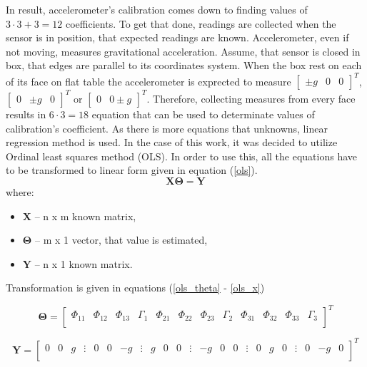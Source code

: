 In result, accelerometer's calibration comes down to finding values of $3 \cdot 3 + 3 = 12$ coefficients. To get that done, readings are collected when the sensor is in position, that expected readings are known. Accelerometer, even if not moving, measures gravitational acceleration. Assume, that sensor is closed in box, that edges are parallel to its coordinates system. When the box rest on each of its face on flat table the accelerometer is exprected to measure $\begin{bmatrix}\pm g & 0 & 0\end{bmatrix}^T$, $\begin{bmatrix}0 & \pm g & 0\end{bmatrix}^T$ or $\begin{bmatrix} 0 & 0 \pm g\end{bmatrix}^T$. Therefore, collecting measures from every face results in $6 \cdot 3 = 18$ equation that can be used to determinate values of calibration's coefficient. As there is more equations that unknowns, linear regression method is used. In the case of this work, it was decided to utilize Ordinal least squares method (OLS). In order to use this, all the equations have to be transformed to linear form given in equation (\ref{ols}).
\begin{equation}
	\bm{X} \bm{\Theta} = \bm{Y}
	\label{ols}
\end{equation}
where:
\begin{itemize}
	\item $\bm{X}$ -- n x m known matrix,
	\item $\bm{\Theta}$ -- m x 1 vector, that value is estimated,
	\item $\bm{Y}$ -- n x 1 known matrix.
\end{itemize}
 
Transformation is given in equations (\ref{ols_theta} - \ref{ols_x})
\setcounter{MaxMatrixCols}{25}

\begin{equation}
	\bm{\Theta} = \begin{bmatrix} \Phi_{11} & \Phi_{12} & \Phi_{13} & \Gamma_1 & \Phi_{21} & \Phi_{22} & \Phi_{23} & \Gamma_2 & \Phi_{31} & \Phi_{32} & \Phi_{33} & \Gamma_3 \\
	\end{bmatrix}^T
	\label{ols_theta}
\end{equation}


\begin{equation}
	\bm{Y} = \begin{bmatrix} 0 & 0 & g & \vdots & 0 & 0 & -g & \vdots & g & 0 & 0 & \vdots & -g & 0 & 0  & \vdots& 0 & g & 0 & \vdots & 0 & -g & 0 \\
	\end{bmatrix}^T
	\label{ols_y}
\end{equation}


